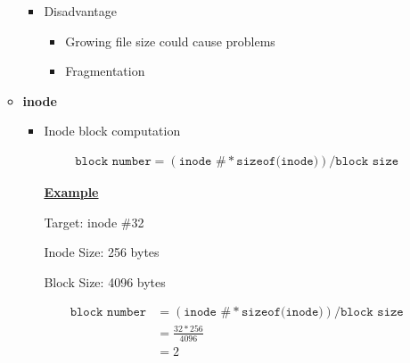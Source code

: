 \documentclass[12pt]{article}
\begin{document}
\begin{enumerate}[1.]
\begin{itemize}
\begin{itemize}
            \item Disadvantage
            \begin{itemize}
                \item Growing file size could cause problems
                \item Fragmentation
            \end{itemize}
        \end{itemize}
        \item \textbf{inode}
        \begin{itemize}
            \item Inode block computation

            \begin{align}
            \texttt{block number} = (\texttt{inode \#} * \texttt{sizeof(inode)}) / \texttt{block size}
            \end{align}

            \bigskip

            \underline{\textbf{Example}}

            \bigskip

            Target: inode \#32

            Inode Size: 256 bytes

            Block Size: 4096 bytes

            \bigskip

            \begin{align}
            \texttt{block number} &= (\texttt{inode \#} * \texttt{sizeof(inode)}) / \texttt{block size}\\
            &= \frac{32 * 256}{4096}\\
            &= 2
            \end{align}



\end{itemize}
\end{itemize}
\end{enumerate}
\end{document}

